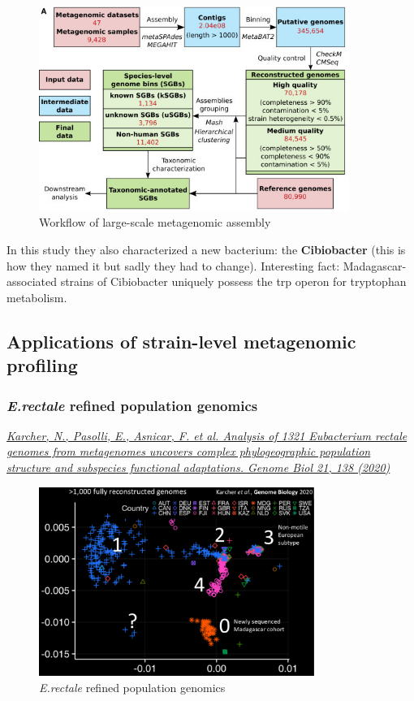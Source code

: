 \begin{figure}[h]
\centering
\includegraphics[width=0.9\textwidth]{workflow2.jpg}
\caption{\label{fig:workflow2}Workflow of large-scale metagenomic assembly}
\end{figure}

In this study they also characterized a new bacterium: the \textbf{Cibiobacter} (this is how they named it but sadly they had to change). Interesting fact: Madagascar-associated strains of Cibiobacter uniquely possess the trp operon for tryptophan metabolism.

\subsection{Applications of strain-level metagenomic profiling}

\subsubsection{\emph{E.rectale} refined population genomics}

\href{https://genomebiology.biomedcentral.com/articles/10.1186/s13059-020-02042-y}{\emph{Karcher, N., Pasolli, E., Asnicar, F. et al. Analysis of 1321 Eubacterium rectale genomes from metagenomes uncovers complex phylogeographic population structure and subspecies functional adaptations. Genome Biol 21, 138 (2020)}}\\

\begin{figure}[!h]
\centering
\includegraphics[width=0.8\textwidth]{Erec2.png}
\caption{\label{fig:Erec2}\emph{E.rectale} refined population genomics}
\end{figure}

